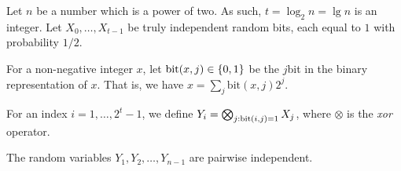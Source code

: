 Let $n$ be a number which is a power of two. As such,
$t = \log_2 n = \lg n$ is an integer.  Let $X_0, \ldots, X_{t-1}$ be truly
independent random bits, each equal to $1$ with probability $1/2$.

For a non-negative integer $x$, let
$\mathrm{bit}(x,j) \in \left\{ {0,1} \right\}$ be the $j$\th bit in the binary
representation of $x$. That is, we have
$x = \sum_{j} \mathrm{bit}(x,j)2^j$.

\newcommand{\bitY}[2]{\mathrm{bit}\pth{#1,#2}}%

For an index $i=1,\ldots, 2^{t}-1$, we define
$Y_i = \bigotimes_{j: \bitY{i}{j} = 1} X_j$, where $\otimes$ is the
\emph{xor} operator.

\begin{lemma}
    The random variables $Y_1, Y_2, \ldots, Y_{n-1}$ are pairwise
    independent.
\end{lemma}
